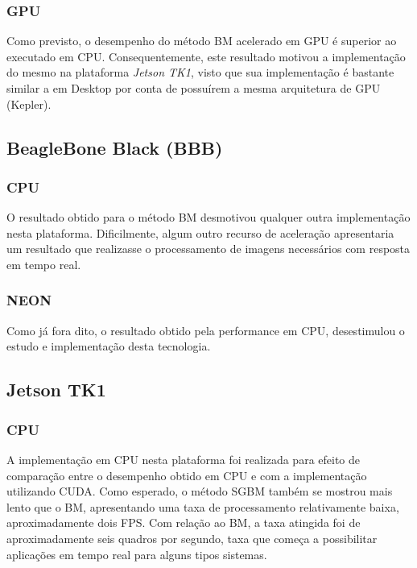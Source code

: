\subsubsection{GPU}

Como previsto, o desempenho do método BM acelerado em GPU é superior ao executado em CPU. Consequentemente, este resultado motivou a implementação do mesmo na plataforma \textit{Jetson TK1}, visto que sua implementação é bastante similar a em Desktop por conta de possuírem a mesma arquitetura de GPU (Kepler).  


\subsection{BeagleBone Black (BBB)}
\subsubsection{CPU}

O resultado obtido para o método BM desmotivou qualquer outra implementação nesta plataforma. Dificilmente, algum outro recurso de aceleração apresentaria um resultado que realizasse o processamento de imagens necessários com resposta em tempo real. 

\subsubsection{NEON}
Como já fora dito, o resultado obtido pela performance em CPU, desestimulou o estudo e implementação desta tecnologia.


\subsection{Jetson TK1}
\subsubsection{CPU}
A implementação em CPU nesta plataforma foi realizada para efeito de comparação entre o desempenho obtido em CPU e com a implementação utilizando CUDA. Como esperado, o método SGBM também se mostrou mais lento que o BM, apresentando uma taxa de processamento relativamente baixa, aproximadamente dois FPS. Com relação ao BM, a taxa atingida foi de aproximadamente seis quadros por segundo, taxa que começa a possibilitar aplicações em tempo real para alguns tipos sistemas.

